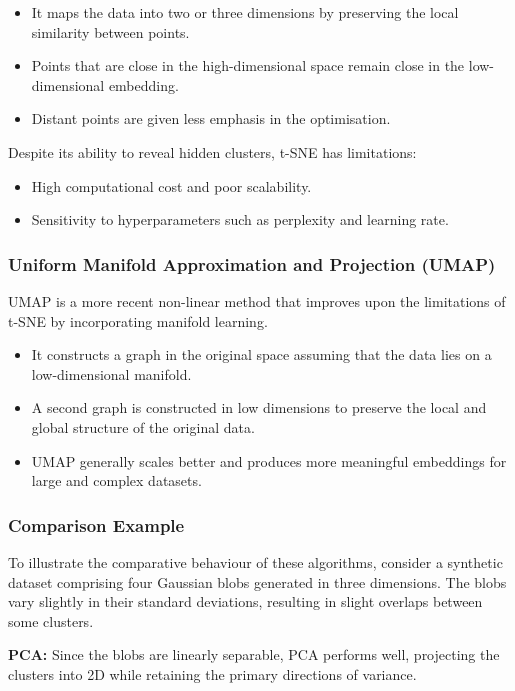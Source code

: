 \documentclass[9pt]{extarticle}
\begin{document}
\begin{itemize}
    \item It maps the data into two or three dimensions by preserving the local similarity between points.
    \item Points that are close in the high-dimensional space remain close in the low-dimensional embedding.
    \item Distant points are given less emphasis in the optimisation.
\end{itemize}

Despite its ability to reveal hidden clusters, t-SNE has limitations:
\begin{itemize}
    \item High computational cost and poor scalability.
    \item Sensitivity to hyperparameters such as perplexity and learning rate.
\end{itemize}

\subsubsection{Uniform Manifold Approximation and Projection (UMAP)}

UMAP is a more recent non-linear method that improves upon the limitations of t-SNE by incorporating manifold learning.

\begin{itemize}
    \item It constructs a graph in the original space assuming that the data lies on a low-dimensional manifold.
    \item A second graph is constructed in low dimensions to preserve the local and global structure of the original data.
    \item UMAP generally scales better and produces more meaningful embeddings for large and complex datasets.
\end{itemize}

\subsubsection{Comparison Example}

To illustrate the comparative behaviour of these algorithms, consider a synthetic dataset comprising four Gaussian blobs generated in three dimensions. The blobs vary slightly in their standard deviations, resulting in slight overlaps between some clusters.

\textbf{PCA:} Since the blobs are linearly separable, PCA performs well, projecting the clusters into 2D while retaining the primary directions of variance.
\end{document}
